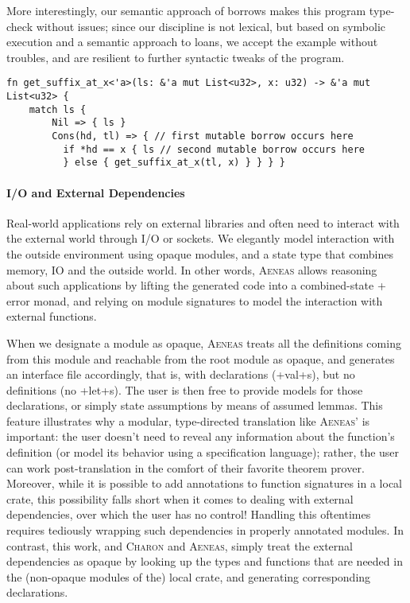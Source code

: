 \documentclass[acmsmall,screen]{acmart}
\newif\iflong
\newif\ifshort
\newcommand{\aeneas}{\textsc{Aeneas}\xspace}
\newcommand{\charon}{\textsc{Charon}\xspace}
\newcommand\myparagraph[1]{\emph{#1}.\ }
\let\myparagraph\paragraph
\begin{document}
More interestingly, our semantic approach of borrows makes this program type-check without issues;
since our discipline is not lexical, but based on symbolic execution and a semantic approach to
loans, we accept the example without troubles, and are resilient to further syntactic tweaks of the program.
\fi
\ifshort
The function below exhibits what is known as a ``non-linear'' lifetime, in
which the borrow for \li+hd+ must be terminated in the \li+then+ branch in
order to regain full ownership of \li+ls+. The existing borrow checker of Rust
cannot account for this usage pattern, but an ongoing rewrite of the
borrow-checker, called Polonius, can. For \aeneas, there is no difference: our
precise semantics of borrows accounts of this use-case without trouble.
\fi

\begin{verbatim}
fn get_suffix_at_x<'a>(ls: &'a mut List<u32>, x: u32) -> &'a mut List<u32> {
    match ls {
        Nil => { ls }
        Cons(hd, tl) => { // first mutable borrow occurs here
          if *hd == x { ls // second mutable borrow occurs here
          } else { get_suffix_at_x(tl, x) } } } }
\end{verbatim}

\myparagraph{I/O and External Dependencies}
Real-world applications rely on external libraries and often need to interact
with the external world through I/O or sockets.
We elegantly model interaction with the outside environment using opaque modules, and
a state type that combines memory, IO and the outside world.
\iflong
In other words, \aeneas allows reasoning about such applications by lifting the generated code into a
combined-state + error monad, and relying on module signatures to model the interaction with
external functions.

When we designate a module as opaque, \aeneas treats all the
definitions coming from this module and reachable from the root module as opaque, and
generates an interface file accordingly, that is, with declarations
(\li+val+s), but no definitions (no \li+let+s).
The user is then free to provide models for those declarations, or simply state assumptions
by means of assumed lemmas.
This feature illustrates why a modular, type-directed translation like \aeneas'
is important: the user doesn't need to reveal
any information about the function's definition (or model its behavior using a
specification language); rather, the user can work post-translation in the
comfort of their favorite theorem prover.
Moreover, while it is possible to add annotations to function signatures in a local crate, this
possibility falls short when it comes to dealing with external dependencies,
over which the user has no control! Handling this oftentimes requires
tediously wrapping such dependencies in properly annotated modules. In contrast,
this work, and \charon and \aeneas, simply treat the external dependencies as opaque
by looking up the types and functions that are needed in the (non-opaque
modules of the) local crate, and generating corresponding declarations.
\end{document}
